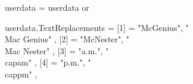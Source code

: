 %
%

\def\Mac{%
  \newbox\MacMBox%
  \setbox\MacMBox\hbox{M}%
  \newbox\MacCBox%
  \setbox\MacCBox\hbox{c}%
  \newbox\MacKernBox%
  \setbox\MacKernBox\hbox{\inframed[offset=\zeropoint, width=fit]{Mc}}%
  \def\MacHeight{\dimexpr\ht\MacMBox-\ht\MacCBox\relax}%
  \def\MacWidth{\dimexpr.9\wd\MacCBox\relax}%
  \def\MacRule{\vrule width .8\MacWidth height .05em depth \zeropoint \relax}%
  \def\MacKernLeft{\dimexpr\MacWidth-0.05em\relax}%
  \def\MacKernRight{.35\MacWidth}%
  M{%
    \dontleavehmode{\raisebox{\MacHeight}\hbox{c}}%
    \kern-\MacKernLeft%
    \MacRule%
    \kern-\MacKernRight%
  }
}%

\startluacode
userdata = userdata or {}

userdata.TextReplacements = { 
  [1] = { "McGenius", "\\Mac Genius" },
  [2] = { "McNester", "\\Mac Nester" },
  [3] = { "a.m.", "\\cap{am}" },
  [4] = { "p.m.", "\\cap{pm}" },
}
\stopluacode

